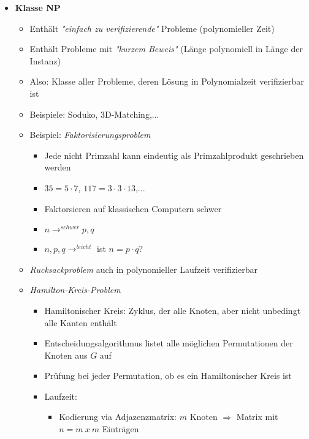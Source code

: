 \begin{itemize}
        \item \textbf{Klasse NP}
            \begin{itemize}
                \item Enthält \textit{\string"einfach zu verifizierende\string"} Probleme (polynomieller Zeit)
                \item Enthält Probleme mit \textit{\string"kurzem Beweis\string"} (Länge polynomiell in Länge der Instanz)
                \item Also: Klasse aller Probleme, deren Lösung in Polynomialzeit verifizierbar ist
                \item Beispiele: Soduko, 3D-Matching,...
                \item Beispiel: \textit{Faktorisierungsproblem}
                    \begin{itemize}
                        \item Jede nicht Primzahl kann eindeutig als Primzahlprodukt geschrieben werden
                        \item $35 = 5 \cdot 7$, $117 = 3 \cdot 3 \cdot 13$,...
                        \item Faktorsieren auf klassischen Computern schwer
                        \item $n \longrightarrow^{schwer} p,q$
                        \item $n,p,q \longrightarrow^{leicht}$ ist $n = p \cdot q?$
                    \end{itemize}
                \item \textit{Rucksackproblem} auch in polynomieller Laufzeit verifizierbar
                \item \textit{Hamilton-Kreis-Problem}
                    \begin{itemize}
                        \item Hamiltonischer Kreis: Zyklus, der alle Knoten, aber nicht unbedingt alle Kanten enthält
                        \item Entscheidungsalgorithmus listet alle möglichen Permutationen der Knoten aus $G$ auf
                        \item Prüfung bei jeder Permutation, ob es ein Hamiltonischer Kreis ist
                        \item Laufzeit:
                            \begin{itemize}
                                \item Kodierung via Adjazenzmatrix: $m$ Knoten $\Rightarrow$ Matrix mit $n = m~x~m$ Einträgen

\end{itemize}
\end{itemize}
\end{itemize}
\end{itemize}
